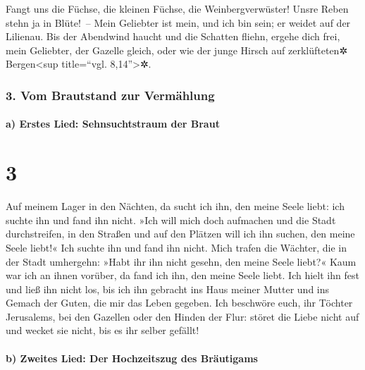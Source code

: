 Fangt uns die Füchse, die kleinen Füchse, die
Weinbergverwüster! Unsre Reben stehn ja in Blüte!~-- Mein
Geliebter ist mein, und ich bin sein; er weidet auf der Lilienau.
Bis der Abendwind haucht und die Schatten fliehn, ergehe
dich frei, mein Geliebter, der Gazelle gleich, oder wie der junge Hirsch
auf zerklüfteten✲ Bergen\textless sup title=``vgl. 8,14''\textgreater✲.

\hypertarget{vom-brautstand-zur-vermuxe4hlung}{%
\subsubsection{3. Vom Brautstand zur
Vermählung}\label{vom-brautstand-zur-vermuxe4hlung}}

\hypertarget{a-erstes-lied-sehnsuchtstraum-der-braut}{%
\paragraph{a) Erstes Lied: Sehnsuchtstraum der
Braut}\label{a-erstes-lied-sehnsuchtstraum-der-braut}}

\hypertarget{section-2}{%
\section{3}\label{section-2}}

Auf meinem Lager in den Nächten, da sucht ich ihn, den
meine Seele liebt: ich suchte ihn und fand ihn nicht. »Ich
will mich doch aufmachen und die Stadt durchstreifen, in den Straßen und
auf den Plätzen will ich ihn suchen, den meine Seele liebt!« Ich suchte
ihn und fand ihn nicht. Mich trafen die Wächter, die in
der Stadt umhergehn: »Habt ihr ihn nicht gesehn, den meine Seele liebt?«
Kaum war ich an ihnen vorüber, da fand ich ihn, den meine
Seele liebt. Ich hielt ihn fest und ließ ihn nicht los, bis ich ihn
gebracht ins Haus meiner Mutter und ins Gemach der Guten, die mir das
Leben gegeben. Ich beschwöre euch, ihr Töchter Jerusalems,
bei den Gazellen oder den Hinden der Flur: störet die Liebe nicht auf
und wecket sie nicht, bis es ihr selber gefällt!

\hypertarget{b-zweites-lied-der-hochzeitszug-des-bruxe4utigams}{%
\paragraph{b) Zweites Lied: Der Hochzeitszug des
Bräutigams}\label{b-zweites-lied-der-hochzeitszug-des-bruxe4utigams}}

